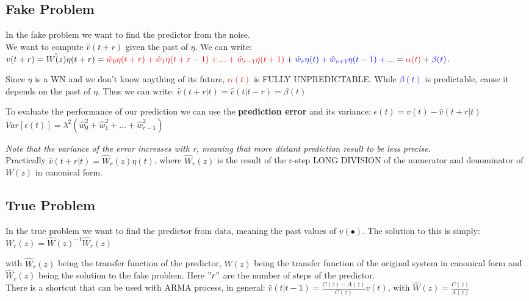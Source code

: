 \documentclass[10pt,a4paper]{article}
\begin{document}
\subsection{Fake Problem}
In the fake problem we want to find the predictor from the noise. \\
We want to compute $\hat{v}(t+r)$ given the past of $\eta$. We can write: \center 
$v(t+r)=\hat{W(z)}\eta(t+r)=\textcolor{red}{\hat{w}_0\eta(t+r)+\hat{w}_1\eta(t+r-1)+...+\hat{w}_{r-1}\eta(t+1)}+\textcolor{blue}{\hat{w}_r\eta(t)+\hat{w}_{r+1}\eta(t-1)+...}=\textcolor{red}{\alpha(t)}+\textcolor{blue}{\beta(t)}$.
\\ \raggedright \vspace{0.5em}
Since $\eta$ is a WN and we don't know anything of its future, \textcolor{red}{$\alpha(t)$} is FULLY UNPREDICTABLE. While \textcolor{blue}{$\beta(t)$} is predictable, cause it depends on the past of $\eta$. Thus we can write:
\center 
$\hat{v}(t+r|t)=\hat{v}(t|t-r)=\beta(t)$
\\ \raggedright \vspace{0.5em}
To evaluate the performance of our prediction we can use the \textbf{prediction error} and its variance:
\center
$\epsilon(t)=v(t)-\hat{v}(t+r|t)$ \\
$Var[\epsilon(t)]=\lambda^2(\hat{w}_0^2+\hat{w}_1^2+...+\hat{w}_{r-1}^2)$
\\ \raggedright \vspace{0.5em}
\textit{Note that the variance of the error increases with r, meaning that more distant prediction result to be less precise.} \\
Practically $\hat{v}(t+r|t)=\hat{W}_r(z)\eta(t)$, where $\hat{W}_r(z)$ is the result of the r-step LONG DIVISION of the numerator and denominator of $W(z)$ in canonical form.
\subsection{True Problem}
In the true problem we want to find the predictor from data, meaning the past values of $v(\bullet)$. The solution to this is simply:
\center $W_r(z)=\hat{W}(z)^{-1}\hat{W}_r(z)$
\\ \raggedright \vspace{0.5em}
with $\hat{W}_r(z)$ being the transfer function of the predictor, $W(z)$ being the transfer function of the original system in canonical form and $\hat{W}_r(z)$ being the solution to the fake problem. Here $"r"$ are the number of steps of the predictor. \\ 
There is a shortcut that can be used with ARMA process, in general:
\center
	$\hat{v}(t|t-1)=\frac{C(z)-A(z)}{C(z)}v(t)$, with $\hat{W}(z)=\frac{C(z)}{A(z)}$
\\ \raggedright
\pagebreak
\end{document}

